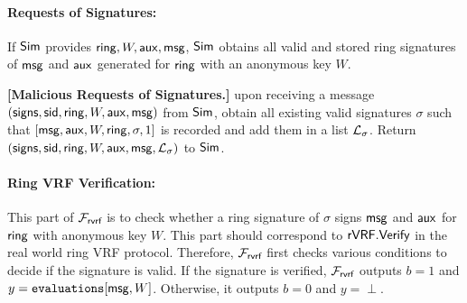 \paragraph{Requests of  Signatures:} If $ \mathsf{Sim} $ provides $ \mathsf{ring},W, \mathsf{aux}, \mathsf{msg}$, $ \mathsf{Sim} $  obtains all valid and stored ring signatures of $ \mathsf{msg} $ and $ \mathsf{aux} $ generated for $ \mathsf{ring} $ with an anonymous key $ W $.  

\begin{tcolorbox}[left=2pt,right=2pt]
	\eprint{}{\scriptsize}
	\textbf{[Malicious Requests of  Signatures.]} upon receiving a message $ (\mathsf{signs}, \textsf{sid}, \mathsf{ring}, W, \mathsf{aux},\mathsf{msg}) $ from $ \mathsf{Sim} $, obtain all existing valid signatures $ \sigma $ such that $ [\mathsf{msg}, \mathsf{aux},W,\mathsf{ring},\sigma, 1] $ is recorded and add them in a list $ {\mathcal{L}}_{\sigma} $. 	Return $ (\mathsf{signs}, \textsf{sid}, \mathsf{ring}, W,\mathsf{aux},\mathsf{msg}, {\mathcal{L}}_{\sigma})  $ to $ \mathsf{Sim} $.
\end{tcolorbox}


\paragraph{Ring VRF Verification:} This part of $ \mathcal{F}_{\textsf{rvrf}} $ is to check whether a ring signature of $ \sigma $ signs $ \mathsf{msg} $ and $ \mathsf{aux} $ for $ \mathsf{ring} $ with anonymous key $ W $. This part should correspond to $ {\mathsf{rVRF}}.{\mathsf{Verify}} $ in the real world ring VRF protocol. Therefore,
$ \mathcal{F}_{\textsf{rvrf}} $ first checks various conditions to decide if the signature is valid. If the signature is verified, $ \mathcal{F}_{\textsf{rvrf}} $ outputs $ b = 1 $ and $ y = \texttt{evaluations}[\mathsf{msg}, W] $. Otherwise, it outputs $ b = 0 $ and $ y = \perp $. 



